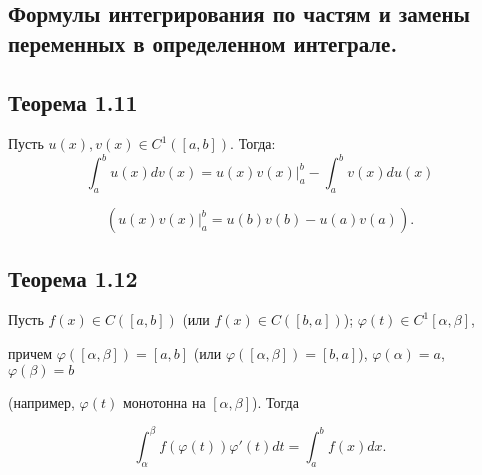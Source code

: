 {
\subsection{Формулы интегрирования по частям и замены переменных в определенном интеграле. }

\subsection*{Теорема 1.11}

Пусть \( u(x), v(x) \in C^1([a, b]) \). Тогда:
\[
\int_{a}^{b} u(x) dv(x) = u(x) v(x) \Big|_{a}^{b} - \int_{a}^{b} v(x) du(x)
\]

\[
(u(x) v(x) \Big|_{a}^{b} = u(b) v(b) - u(a) v(a)).
\]

\subsection*{Теорема 1.12}

Пусть \( f(x) \in C([a, b]) \) (или \( f(x) \in C([b, a]) \)); \( \varphi(t) \in C^1[\alpha, \beta] \),

причем \( \varphi([\alpha, \beta]) = [a, b] \) (или \( \varphi([\alpha, \beta]) = [b, a] \)), \( \varphi(\alpha) = a \), \( \varphi(\beta) = b \)

(например, \( \varphi(t) \) монотонна на \( [\alpha, \beta] \)). Тогда

\[
\int_{\alpha}^{\beta} f(\varphi(t)) \varphi'(t) dt = \int_{a}^{b} f(x) dx.
\]

}